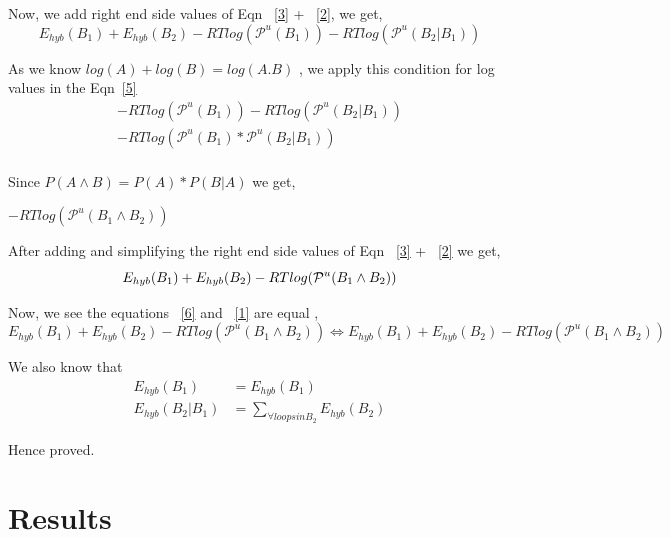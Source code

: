 \documentclass[twoside,a4paper]{report}
\begin{document}
Now, we add right end side values of Eqn ~\ref{3} + ~\ref{2}, we get,\\
	\begin{equation}
	\label{5}
	 E_{hyb}(B_1) + E_{hyb}(B_2) - RTlog(\mathcal{P}^u(B_1)) - RTlog(\mathcal{P}^u(B_2 | B_1))
	\end{equation}
	 
	As we know $log (A) + log (B) = log( A . B)$ , we apply this condition for log values in the Eqn~\ref{5}\\
	
	\begin{align*}
		-RTlog(\mathcal{P}^u(B_1)) - RTlog(\mathcal{P}^u(B_2 | B_1))\\
		-RTlog(\mathcal{P}^u(B_1) * \mathcal{P}^u(B_2 | B_1))\\
	\end{align*}
	
	Since $P(A \land B) = P(A) * P(B |A)$ we get,\\
	
	\begin{center}
		$-RTlog(\mathcal{P}^u(B_1 \land B_2))$
	\end{center}

 	After adding and simplifying the right end side values of Eqn ~\ref{3} + ~\ref{2} we get, \\
 	
 	\begin{equation}
 	\label{6}
 	E_{hyb}(B_1) + E_{hyb}(B_2) - RTlog(\mathcal{P}^u(B_1 \land B_2))\\
 	\end{equation}
	
	Now,  we see the equations ~\ref{6} and ~\ref{1} are equal ,\\
	\begin{equation}
	\label{7}
	E_{hyb}(B_1)+E_{hyb}(B_2)-RTlog(\mathcal{P}^u(B_1 \land B_2)) \Leftrightarrow E_{hyb}(B_1) + E_{hyb}(B_2) - RTlog(\mathcal{P}^u(B_1 \land B_2))
	\end{equation}
	
	We also know that \\
	\begin{align*}
		E_{hyb}(B_1) &= E_{hyb}(B_1)\\
		E_{hyb}( B_2 | B_1 ) &= \sum_{\forall loops in B_2}E_{hyb}(B_2)
	\end{align*}
	
	Hence proved. \\
	
	
	\chapter{Results}
	
\end{document}
